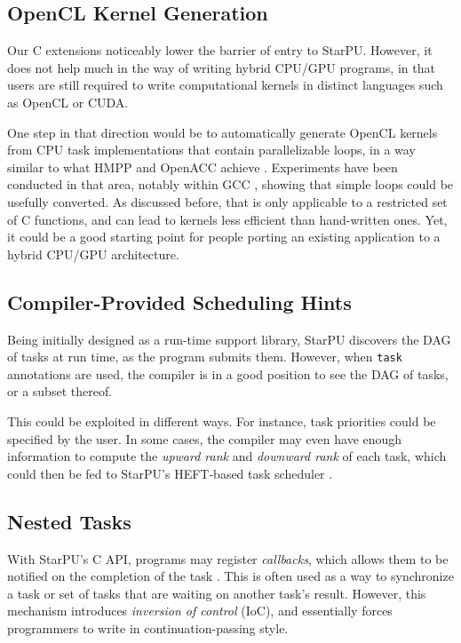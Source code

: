 \documentclass[twoside, a4paper, 10pt]{article}
\begin{document}
\subsection{OpenCL Kernel Generation}
\label{sec-5-2}


Our C extensions noticeably lower the barrier of entry to StarPU.
However, it does not help much in the way of writing hybrid CPU/GPU
programs, in that users are still required to write computational
kernels in distinct languages such as OpenCL or CUDA.

One step in that direction would be to automatically generate OpenCL
kernels from CPU task implementations that contain parallelizable loops,
in a way similar to what HMPP and OpenACC achieve
\cite{dolbeau07:hmpp,openacc1.0:2012}.  Experiments have been conducted
in that area, notably within GCC \cite{kravets2009:graphite-opencl},
showing that simple loops could be usefully converted.  As discussed
before, that is only applicable to a restricted set of C functions, and
can lead to kernels less efficient than hand-written ones.  Yet, it
could be a good starting point for people porting an existing
application to a hybrid CPU/GPU architecture.
\subsection{Compiler-Provided Scheduling Hints}
\label{sec-5-3}


Being initially designed as a run-time support library, StarPU discovers
the DAG of tasks at run time, as the program submits them.  However,
when \texttt{task} annotations are used, the compiler is in a good position to
see the DAG of tasks, or a subset thereof.

This could be exploited in different ways.  For instance, task
priorities could be specified by the user.  In some cases, the compiler
may even have enough information to compute the \emph{upward rank} and
\emph{downward rank} of each task, which could then be fed to StarPU's
HEFT-based task scheduler \cite{Topcuouglu:2002:PLT:566137.566142}.
\subsection{Nested Tasks}
\label{sec-5-4}


With StarPU's C API, programs may register \emph{callbacks}, which allows
them to be notified on the completion of the task
\cite{runtime12:starpu-handbook}.  This is often used as a way to
synchronize a task or set of tasks that are waiting on another task's
result.  However, this mechanism introduces \emph{inversion of control}
(IoC), and essentially forces programmers to write in
continuation-passing style.
\end{document}
